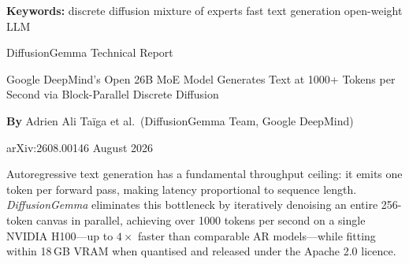 \documentclass[10pt,twocolumn]{article}
\begin{document}
\setlength{\parindent}{0pt}
\setlength{\parskip}{4pt}

{\small\color{keywordgray}\textbf{Keywords:}
  discrete diffusion \textbullet{}
  mixture of experts \textbullet{}
  fast text generation \textbullet{}
  open-weight LLM}\par\vspace{4pt}

{\LARGE\bfseries\raggedright
  DiffusionGemma Technical Report}\par\vspace{4pt}

{\large\itshape\raggedright
  Google DeepMind's Open 26B MoE Model Generates Text at 1000+ Tokens per Second
  via Block-Parallel Discrete Diffusion}\par\vspace{6pt}

{\small\textbf{By} Adrien Ali Ta\"iga et al.\ (DiffusionGemma Team,
  Google DeepMind)}\par\vspace{2pt}

{\small\color{keywordgray}arXiv:2608.00146 \textbullet{} August 2026}
\par\vspace{2pt}\noindent{\color{rulered}\rule{\columnwidth}{0.6pt}}\vspace{6pt}

Autoregressive text generation has a fundamental throughput ceiling: it emits one token
per forward pass, making latency proportional to sequence length. \textit{DiffusionGemma}
eliminates this bottleneck by iteratively denoising an entire 256-token canvas in parallel,
achieving over 1000 tokens per second on a single NVIDIA H100---up to $4\times$ faster than
comparable AR models---while fitting within 18\,GB VRAM when quantised and released
under the Apache 2.0 licence.
\end{document}
